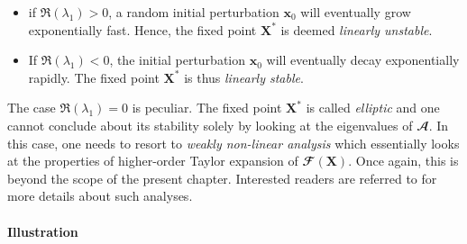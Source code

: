   \begin{itemize}
    \item if $\Re \left( \lambda_1 \right) > 0$, a random initial perturbation $\mathbf{x}_0$ will eventually grow exponentially fast. Hence, the fixed point $\mathbf{X}^*$ is deemed \emph{linearly unstable}.

    \item If $\Re \left( \lambda_1 \right) < 0$, the initial perturbation $\mathbf{x}_0$ will eventually decay exponentially rapidly. The fixed point $\mathbf{X}^*$ is thus \emph{linearly stable}.
  \end{itemize}
  The case $\Re \left( \lambda_1 \right) = 0$ is peculiar. The fixed point $\mathbf{X}^*$ is called \emph{elliptic} and one cannot conclude about its stability solely by looking at the eigenvalues of $\mathbfcal{A}$. In this case, one needs to resort to \emph{weakly non-linear analysis} which essentially looks at the properties of higher-order Taylor expansion of $\mathbfcal{F} \left( \mathbf{X} \right)$. Once again, this is beyond the scope of the present chapter. Interested readers are referred to \cite{??} for more details about such analyses.

  \paragraph*{Illustration}

